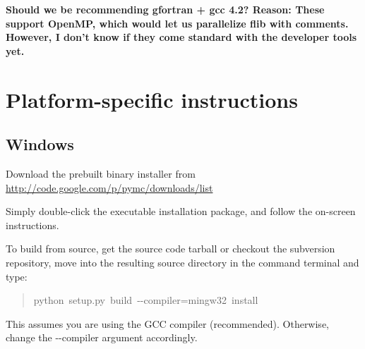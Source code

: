 \textbf{Should we be recommending gfortran + gcc 4.2? Reason: These support OpenMP, which would let us parallelize flib with comments. However, I don't know if they come standard with the developer tools yet.}



\hypertarget{platform-specific-instructions}{}
\section*{Platform-specific instructions}
\label{platform-specific-instructions}



\hypertarget{windows}{}
\subsection*{Windows}
\label{windows}
\begin{list}{.}
{
\setlength{\rightmargin}{\leftmargin}
}
\item {} 
Download the prebuilt binary installer from \href{http://code.google.com/p/pymc/downloads/list}{http://code.google.com/p/pymc/downloads/list}

\item {} 
Simply double-click the executable installation package, and follow the on-screen instructions.

\end{list}

To build from source, get the source code tarball or checkout the subversion
repository, move into the resulting source directory in the command terminal
and type:
\begin{quote}{\ttfamily \raggedright \noindent
python~setup.py~build~-{}-compiler=mingw32~install
}\end{quote}

This assumes you are using the GCC compiler (recommended). Otherwise,
change the -{}-compiler argument accordingly.



\hypertarget{mac-os-x}{}
